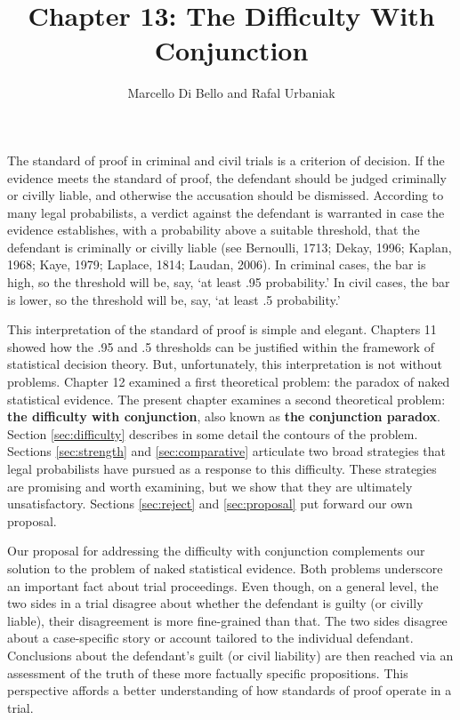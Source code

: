 \documentclass[
  10pt,
  dvipsnames,enabledeprecatedfontcommands]{scrartcl}
\title{Chapter 13: The Difficulty With Conjunction}
\author{Marcello Di Bello and Rafal Urbaniak}
\date{}
\begin{document}
\maketitle

The standard of proof in criminal and civil trials is a criterion of
decision. If the evidence meets the standard of proof, the defendant
should be judged criminally or civilly liable, and otherwise the
accusation should be dismissed. According to many legal probabilists, a
verdict against the defendant is warranted in case the evidence
establishes, with a probability above a suitable threshold, that the
defendant is criminally or civilly liable (see Bernoulli, 1713; Dekay,
1996; Kaplan, 1968; Kaye, 1979; Laplace, 1814; Laudan, 2006). In
criminal cases, the bar is high, so the threshold will be, say, `at
least .95 probability.' In civil cases, the bar is lower, so the
threshold will be, say, `at least .5 probability.'

This interpretation of the standard of proof is simple and elegant.
Chapters 11  showed how the .95 and .5
thresholds can be justified within the framework of statistical decision
theory. But, unfortunately, this interpretation is not without problems.
Chapter 12  examined a first theoretical
problem: the paradox of naked statistical evidence. The present chapter
examines a second theoretical problem:
\textbf{the difficulty with conjunction}, also known as
\textbf{the conjunction paradox}. Section \ref{sec:difficulty} describes
in some detail the contours of the problem. Sections \ref{sec:strength}
and \ref{sec:comparative} articulate two broad strategies that legal
probabilists have pursued as a response to this difficulty. These
strategies are promising and worth examining, but we show that they are
ultimately unsatisfactory. Sections \ref{sec:reject} and
\ref{sec:proposal} put forward our own proposal.

Our proposal for addressing the difficulty with conjunction complements
our solution to the problem of naked statistical evidence. Both problems
underscore an important fact about trial proceedings. Even though, on a
general level, the two sides in a trial disagree about whether the
defendant is guilty (or civilly liable), their disagreement is more
fine-grained than that. The two sides disagree about a case-specific
story or account tailored to the individual defendant. Conclusions about
the defendant's guilt (or civil liability) are then reached via an
assessment of the truth of these more factually specific propositions.
This perspective affords a better understanding of how standards of
proof operate in a trial.
\end{document}
